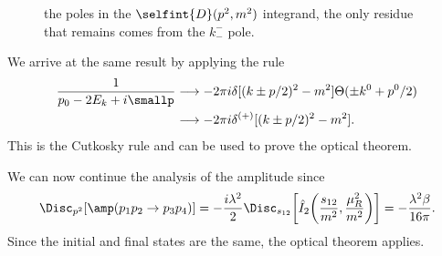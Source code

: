 \begin{figure}[h]
    \centering

    \caption{the poles in the $\selfint{D}(p^2,m^2)$ integrand, the only residue that remains comes from the $k_-^-$ pole.}
    \label{fig: A4 disconiutities in s12 channel}
\end{figure}
\begin{obs}
    We arrive at the same result by applying the rule 
    \begin{equation}
        \begin{split}
            \frac{1}{p_0 - 2E_k + i\smallp} &\longrightarrow -2\pi i\delta[(k \pm p/2)^2 - m^2]\Theta(\pm k^0 + p^0/2) \\
            &\longrightarrow -2\pi i\delta^{(+)}[(k \pm p/2)^2 - m^2].
        \end{split}
    \end{equation}
    This is the Cutkosky rule and can be used to prove the optical theorem.
\end{obs}
We can now continue the analysis of the amplitude since 
\begin{equation}
    \Disc_{p^2}[\amp(p_1p_2 \to p_3p_4)] = -\frac{i\lambda^2}{2}\Disc_{s_{12}}\bigg[\hat{I}_2\bigg(\frac{s_{12}}{m^2},\frac{\mu_R^2}{m^2}\bigg)\bigg] = -\frac{\lambda^2\beta}{16\pi}.
\end{equation}
Since the initial and final states are the same, the optical theorem applies.

